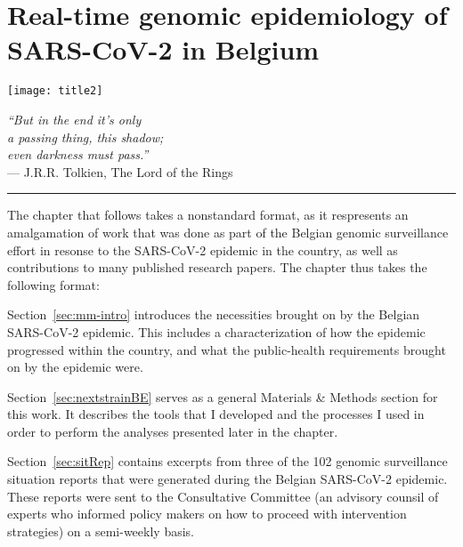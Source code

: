 \chapter{Real-time genomic epidemiology of SARS-CoV-2 in Belgium}\label{ch:chapter1}

\begin{minipage}[b]{0.6\textwidth}
    \texttt{[image: title2]} %
  \end{minipage}
  \hfill
  \begin{minipage}[b]{0.35\textwidth}
    \footnotesize
    \begin{flushright}
      \textit{``But in the end it's only\\a passing thing, this shadow;\\even darkness must pass.''} \\
      --- J.R.R.
Tolkien, The Lord of the Rings
    \end{flushright}
    \vspace{2cm}
\end{minipage}
  
\clearpage

\onehalfspacing

\singlespacing
\hrule
\vspace*{12pt}
The chapter that follows takes a nonstandard format, as it respresents an amalgamation of work that was done as part of the Belgian genomic surveillance effort in resonse to the SARS-CoV-2 epidemic in the country, as well as contributions to many published research papers. The chapter thus takes the following format:

Section~\ref{sec:mm-intro} introduces the necessities brought on by the Belgian SARS-CoV-2 epidemic. This includes a characterization of how the epidemic progressed within the country, and what the public-health requirements brought on by the epidemic were.

Section~\ref{sec:nextstrainBE} serves as a general Materials \& Methods section for this work. It describes the tools that I developed and the processes I used in order to perform the analyses presented later in the chapter.

Section~\ref{sec:sitRep} contains excerpts from three of the 102 genomic surveillance situation reports that were generated during the Belgian SARS-CoV-2 epidemic. These reports were sent to the Consultative Committee (an advisory counsil of experts who informed policy makers on how to proceed with intervention strategies) on a semi-weekly basis.

